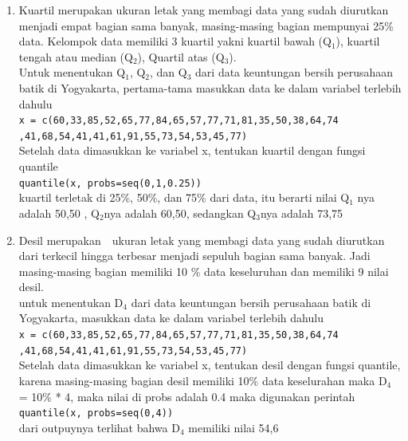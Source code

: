 \documentclass[a4paper,12pt]{article}
\begin{document}
\begin{enumerate}[label=\alph*.]
	\item Kuartil merupakan ukuran letak yang membagi data yang sudah diurutkan menjadi empat bagian sama banyak, masing-masing bagian mempunyai 25\% data.
	Kelompok data memiliki 3 kuartil yakni kuartil bawah (Q$_{1}$), kuartil tengah atau median (Q$_{2}$), Quartil atas (Q$_{3}$). 
	\\Untuk menentukan Q$_{1}$, Q$_{2}$, dan Q$_{3}$ dari data keuntungan bersih perusahaan batik di Yogyakarta, pertama-tama masukkan data ke dalam variabel terlebih dahulu\\
	\texttt{x = c(60,33,85,52,65,77,84,65,57,77,71,81,35,50,38,64,74\\,41,68,54,41,41,61,91,55,73,54,53,45,77)\\}
	Setelah data dimasukkan ke variabel x, tentukan kuartil dengan fungsi quantile\\
	\texttt{quantile(x, probs=seq(0,1,0.25))\\}
	kuartil terletak di 25\%, 50\%, dan 75\% dari data, itu berarti nilai Q$_{1}$ nya adalah 50,50 , Q$_{2}$nya adalah 60,50, sedangkan Q$_{3}$nya adalah 73,75
	
	\item Desil merupakan  ukuran letak yang membagi data yang sudah diurutkan dari terkecil hingga terbesar menjadi sepuluh bagian sama banyak. Jadi masing-masing bagian memiliki 10 \% data keseluruhan dan memiliki 9 nilai desil.\\
	untuk menentukan D$_{4}$ dari data keuntungan bersih perusahaan batik di Yogyakarta, masukkan data ke dalam variabel terlebih dahulu\\
	\texttt{x = c(60,33,85,52,65,77,84,65,57,77,71,81,35,50,38,64,74\\,41,68,54,41,41,61,91,55,73,54,53,45,77)\\}
	Setelah data dimasukkan ke variabel x, tentukan desil dengan fungsi quantile, karena masing-masing bagian desil memiliki 10\% data keselurahan maka D$_{4}$ = 10\% * 4, maka nilai di probs adalah 0.4 maka digunakan perintah\\
	\texttt{quantile(x, probs=seq(0,4))\\}
	dari outpuynya terlihat bahwa D$_{4}$ memiliki nilai 54,6
\end{enumerate}
\end{document}
